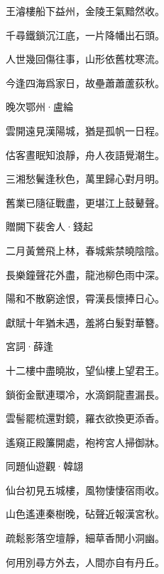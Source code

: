 \documentclass[12pt,a4paper]{ctexbook}
\begin{document}
王濬樓船下益州，金陵王氣黯然收。\par
千尋鐵鎖沉江底，一片降幡出石頭。\par
人世幾回傷往事，山形依舊枕寒流。\par
今逢四海爲家日，故壘蕭蕭蘆荻秋。\par
晚次鄂州·盧綸\par
雲開遠見漢陽城，猶是孤帆一日程。\par
估客晝眠知浪靜，舟人夜語覺潮生。\par
三湘愁鬢逢秋色，萬里歸心對月明。\par
舊業已隨征戰盡，更堪江上鼓鼙聲。\par
贈闕下裴舍人·錢起\par
二月黃鶯飛上林，春城紫禁曉陰陰。\par
長樂鐘聲花外盡，龍池柳色雨中深。\par
陽和不散窮途恨，霄漢長懷捧日心。\par
獻賦十年猶未遇，羞將白髮對華簪。\par
宮詞·薛逢\par
十二樓中盡曉妝，望仙樓上望君王。\par
鎖銜金獸連環冷，水滴銅龍晝漏長。\par
雲髻罷梳還對鏡，羅衣欲換更添香。\par
遙窺正殿簾開處，袍袴宮人掃御牀。\par
同題仙遊觀·韓翃\par
仙台初見五城樓，風物悽悽宿雨收。\par
山色遙連秦樹晚，砧聲近報漢宮秋。\par
疏鬆影落空壇靜，細草香閒小洞幽。\par
何用別尋方外去，人間亦自有丹丘。\par
\end{document}
